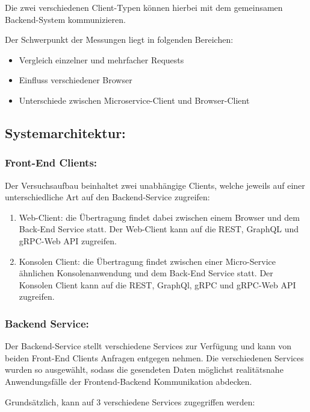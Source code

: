 Die zwei verschiedenen Client-Typen können hierbei mit dem gemeinsamen Backend-System kommunizieren.

Der Schwerpunkt der Messungen liegt in folgenden Bereichen:

\begin{itemize}
	\item Vergleich einzelner und mehrfacher Requests
	\item Einfluss verschiedener Browser
	\item Unterschiede zwischen Microservice-Client und Browser-Client
\end{itemize}

\subsection*{Systemarchitektur:}

\subsubsection*{Front-End Clients:}
Der Versuchsaufbau beinhaltet zwei unabhängige Clients, welche jeweils auf einer unterschiedliche Art auf den Backend-Service zugreifen:
\begin{enumerate}
	\item Web-Client: die Übertragung findet dabei zwischen einem Browser und dem Back-End Service statt. Der Web-Client kann auf die REST, GraphQL und gRPC-Web API zugreifen.
	\item Konsolen Client: die Übertragung findet zwischen einer Micro-Service ähnlichen Konsolenanwendung und dem Back-End Service statt. Der Konsolen Client kann auf die REST, GraphQl, gRPC und gRPC-Web API zugreifen.
	
\end{enumerate}

\subsubsection*{Backend Service:}
Der Backend-Service stellt verschiedene Services zur Verfügung und kann von beiden Front-End Clients Anfragen entgegen nehmen.
Die verschiedenen Services wurden so ausgewählt, sodass die gesendeten Daten möglichst realitätsnahe Anwendungsfälle der Frontend-Backend Kommunikation abdecken.

Grundsätzlich, kann auf 3 verschiedene Services zugegriffen werden:

